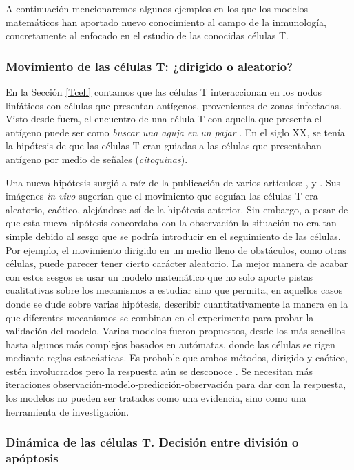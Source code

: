 A continuación mencionaremos algunos ejemplos en los que los modelos matemáticos han aportado nuevo conocimiento al campo de la inmunología, concretamente al enfocado en el estudio de las conocidas células T. 

\subsubsection{Movimiento de las células T: ¿dirigido o aleatorio?}

En la Sección \ref{Tcell} contamos que las células T interaccionan en los nodos linfáticos con células que presentan antígenos, provenientes de zonas infectadas. Visto desde fuera, el encuentro de una célula T con aquella que presenta el antígeno puede ser como \textit{buscar una aguja en un pajar} \citep{mathsModInmu}. En el siglo XX, se tenía la hipótesis de que las células T eran guiadas a las células que presentaban antígeno por medio de señales (\textit{citoquinas}). 

Una nueva hipótesis surgió a raíz de la publicación de varios artículos: \cite{Miller1869}, \cite{Stoll1873} y \cite{Bousso1876}. Sus imágenes \textit{in vivo} sugerían que el movimiento que seguían las células T era aleatorio, caótico, alejándose así de la hipótesis anterior. Sin embargo, a pesar de que esta nueva hipótesis concordaba con la observación la situación no era tan simple debido al sesgo que se podría introducir en el seguimiento de las células. Por ejemplo, el movimiento dirigido en un medio lleno de obstáculos, como otras células, puede parecer tener cierto carácter aleatorio. La mejor manera de acabar con estos sesgos es usar un modelo matemático que no solo aporte pistas cualitativas sobre los mecanismos a estudiar sino que permita, en aquellos casos donde se dude sobre varias hipótesis, describir cuantitativamente la manera en la que diferentes mecanismos se combinan en el experimento para probar la validación del modelo. 
Varios modelos fueron propuestos, desde los más sencillos hasta algunos más complejos basados en autómatas, donde las células se rigen mediante reglas estocásticas. Es probable que ambos métodos, dirigido y caótico, estén involucrados pero la respuesta aún se desconoce \citep{mathsModInmu}. Se necesitan más iteraciones observación-modelo-predicción-observación para dar con la respuesta, los modelos no pueden ser tratados como una evidencia, sino como una herramienta de investigación.

\subsubsection{Dinámica de las células T. Decisión entre división o apóptosis}


